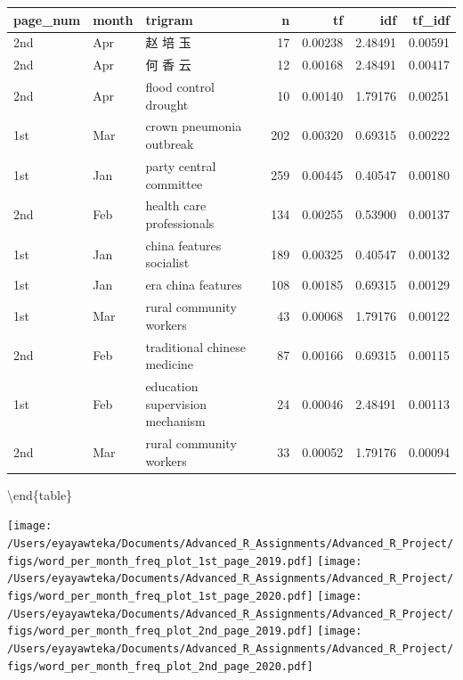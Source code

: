 \documentclass[
  12pt,
]{article}
\begin{document}
\begin{tabular}[t]{lllrrrr}
\toprule
page\_num & month & trigram & n & tf & idf & tf\_idf\\
\midrule
2nd & Apr & 赵 培 玉 & 17 & 0.00238 & 2.48491 & 0.00591\\
2nd & Apr & 何 香 云 & 12 & 0.00168 & 2.48491 & 0.00417\\
2nd & Apr & flood control drought & 10 & 0.00140 & 1.79176 & 0.00251\\
1st & Mar & crown pneumonia outbreak & 202 & 0.00320 & 0.69315 & 0.00222\\
1st & Jan & party central committee & 259 & 0.00445 & 0.40547 & 0.00180\\
\addlinespace
2nd & Feb & health care professionals & 134 & 0.00255 & 0.53900 & 0.00137\\
1st & Jan & china features socialist & 189 & 0.00325 & 0.40547 & 0.00132\\
1st & Jan & era china features & 108 & 0.00185 & 0.69315 & 0.00129\\
1st & Mar & rural community workers & 43 & 0.00068 & 1.79176 & 0.00122\\
2nd & Feb & traditional chinese medicine & 87 & 0.00166 & 0.69315 & 0.00115\\
\addlinespace
1st & Feb & education supervision mechanism & 24 & 0.00046 & 2.48491 & 0.00113\\
2nd & Mar & rural community workers & 33 & 0.00052 & 1.79176 & 0.00094\\
\bottomrule
\end{tabular}

\textbackslash end\{table\}

\texttt{[image: /Users/eyayawteka/Documents/Advanced\_R\_Assignments/Advanced\_R\_Project/figs/word\_per\_month\_freq\_plot\_1st\_page\_2019.pdf]} \texttt{[image: /Users/eyayawteka/Documents/Advanced\_R\_Assignments/Advanced\_R\_Project/figs/word\_per\_month\_freq\_plot\_1st\_page\_2020.pdf]} \texttt{[image: /Users/eyayawteka/Documents/Advanced\_R\_Assignments/Advanced\_R\_Project/figs/word\_per\_month\_freq\_plot\_2nd\_page\_2019.pdf]} \texttt{[image: /Users/eyayawteka/Documents/Advanced\_R\_Assignments/Advanced\_R\_Project/figs/word\_per\_month\_freq\_plot\_2nd\_page\_2020.pdf]}
\end{document}
